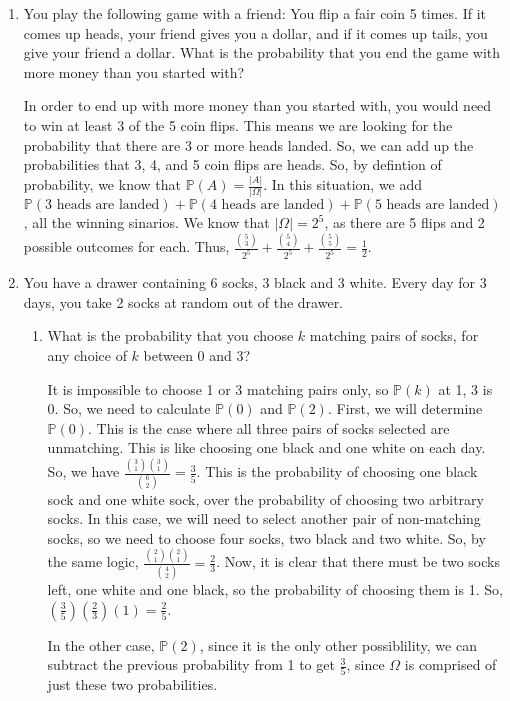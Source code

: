 \documentclass[12pt]{article}
\renewcommand{\P}{\mathbb{P}}
\newcommand{\p}[1]{\P\left(#1\right)}
\begin{document}
\begin{enumerate}
\item You play the following game with a friend: You flip a fair coin 5 times. If it comes up heads, your friend gives you a dollar, and if it comes up tails, you give your friend a dollar. What is the probability that you end the game with more money than you started with?

In order to end up with more money than you started with, you would need to win at least 3 of the 5 coin flips. This means we are looking for the probability that there are 3 or more heads landed. So, we can add up the probabilities that 3, 4, and 5 coin flips are heads. So, by defintion of probability, we know that $\p{A} = \frac{|A|}{|\Omega|}$. In this situation, we add $\p{\text{3 heads are landed}} + \p{\text{4 heads are landed}} + \p{\text{5 heads are landed}}$, all the winning sinarios. We know that $|\Omega| = 2^5$, as there are 5 flips and 2 possible outcomes for each. Thus, $\frac{\binom{5}{3}}{2^{5}} + \frac{\binom{5}{4}}{2^{5}} + \frac{\binom{5}{5}}{2^{5}} = \frac{1}{2}$.

\item You have a drawer containing 6 socks, 3 black and 3 white. Every day for 3 days, you take 2 socks at random out of the drawer.
\begin{enumerate}
\item  What is the probability that you choose $k$ matching pairs of socks, for any choice of $k$ between 0 and 3?

It is impossible to choose 1 or 3 matching pairs only, so $\p{k}$ at 1, 3 is 0. So, we need to calculate $\p{0}$ and $\p{2}$. First, we will determine $\p{0}$. This is the case where all three pairs of socks selected are unmatching. This is like choosing one black and one white on each day. So, we have $\frac{\binom{3}{1}\binom{3}{1}}{\binom{6}{2}} = \frac{3}{5}$. This is the probability of choosing one black sock and one white sock, over the probability of choosing two arbitrary socks. In this case, we will need to select another pair of non-matching socks, so we need to choose four socks, two black and two white. So, by the same logic, $\frac{\binom{2}{1}\binom{2}{1}}{\binom{4}{2}} = \frac{2}{3}$. Now, it is clear that there must be two socks left, one white and one black, so the probability of choosing them is 1. So, $(\frac{3}{5})(\frac{2}{3})(1) = \frac{2}{5}$. 

In the other case, $\p{2}$, since it is the only other possiblility, we can subtract the previous probability from 1 to get $\frac{3}{5}$, since $\Omega$ is comprised of just these two probabilities. 


\end{enumerate}
\end{enumerate}
\end{document}
